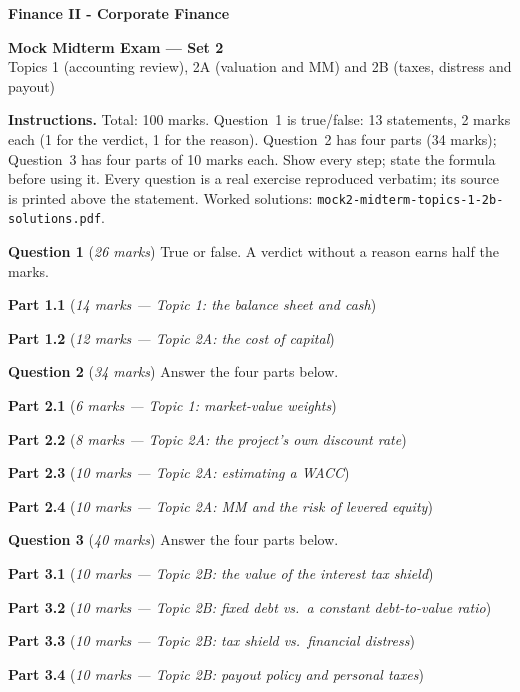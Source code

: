 \documentclass[11pt,a4paper]{article}
\newcommand{\qpart}[2]{\par\needspace{12\baselineskip}\medskip\noindent\textbf{#1} (\emph{#2})\par}
\begin{document}
\textbf{Finance II - Corporate Finance}

\begin{center}
  {\LARGE\bfseries Mock Midterm Exam --- Set 2}\\[4pt]
  {\large Topics 1 (accounting review), 2A (valuation and MM) and 2B (taxes, distress and payout)}
\end{center}

\noindent\textbf{Instructions.} Total: 100 marks. Question~1 is true/false: 13 statements, 2 marks
each (1 for the verdict, 1 for the reason). Question~2 has four parts (34 marks); Question~3 has four
parts of 10 marks each. Show every step; state the formula before using it. Every question is a real
exercise reproduced verbatim; its source is printed above the statement. Worked solutions:
\texttt{mock2-midterm-topics-1-2b-solutions.pdf}.

\bigskip
\noindent\textbf{Question 1} (\emph{26 marks}) True or false. A verdict without a reason earns half the
marks.

\qpart{Part 1.1}{14 marks --- Topic 1: the balance sheet and cash}
\QoneA

\qpart{Part 1.2}{12 marks --- Topic 2A: the cost of capital}
\QoneB

\bigskip
\noindent\textbf{Question 2} (\emph{34 marks}) Answer the four parts below.

\qpart{Part 2.1}{6 marks --- Topic 1: market-value weights}
\QtwoA

\qpart{Part 2.2}{8 marks --- Topic 2A: the project's own discount rate}
\QtwoB

\qpart{Part 2.3}{10 marks --- Topic 2A: estimating a WACC}
\QtwoC

\qpart{Part 2.4}{10 marks --- Topic 2A: MM and the risk of levered equity}
\QtwoD

\newpage
\noindent\textbf{Question 3} (\emph{40 marks}) Answer the four parts below.

\qpart{Part 3.1}{10 marks --- Topic 2B: the value of the interest tax shield}
\QthreeA

\qpart{Part 3.2}{10 marks --- Topic 2B: fixed debt vs.\ a constant debt-to-value ratio}
\QthreeB

\qpart{Part 3.3}{10 marks --- Topic 2B: tax shield vs.\ financial distress}
\QthreeC

\qpart{Part 3.4}{10 marks --- Topic 2B: payout policy and personal taxes}
\QthreeD
\end{document}
